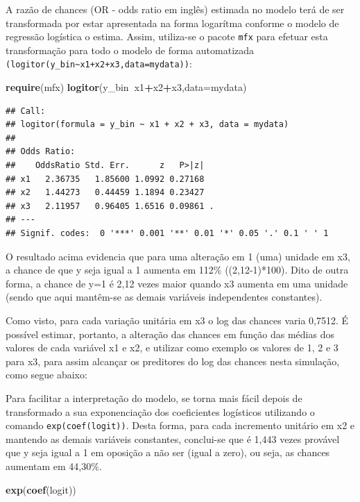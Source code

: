 \documentclass[12pt,brazil,]{book}
\newenvironment{Shaded}{\begin{snugshade}}{\end{snugshade}}
\newcommand{\DataTypeTok}[1]{\textcolor[rgb]{0.13,0.29,0.53}{#1}}
\newcommand{\KeywordTok}[1]{\textcolor[rgb]{0.13,0.29,0.53}{\textbf{#1}}}
\newcommand{\NormalTok}[1]{#1}
\newcommand{\OperatorTok}[1]{\textcolor[rgb]{0.81,0.36,0.00}{\textbf{#1}}}
\begin{document}
A razão de chances (OR - odds ratio em inglês) estimada no modelo terá
de ser transformada por estar apresentada na forma logarítma conforme o
modelo de regressão logística o estima. Assim, utiliza-se o pacote
\texttt{mfx} para efetuar esta transformação para todo o modelo de forma
automatizada
\texttt{(logitor(y\_bin\textasciitilde{}x1+x2+x3,data=mydata))}:

\begin{Shaded}
\begin{Highlighting}[]
\KeywordTok{require}\NormalTok{(mfx)}
\KeywordTok{logitor}\NormalTok{(y_bin}\OperatorTok{~}\NormalTok{x1}\OperatorTok{+}\NormalTok{x2}\OperatorTok{+}\NormalTok{x3,}\DataTypeTok{data=}\NormalTok{mydata)}
\end{Highlighting}
\end{Shaded}

\begin{verbatim}
## Call:
## logitor(formula = y_bin ~ x1 + x2 + x3, data = mydata)
## 
## Odds Ratio:
##    OddsRatio Std. Err.      z   P>|z|  
## x1   2.36735   1.85600 1.0992 0.27168  
## x2   1.44273   0.44459 1.1894 0.23427  
## x3   2.11957   0.96405 1.6516 0.09861 .
## ---
## Signif. codes:  0 '***' 0.001 '**' 0.01 '*' 0.05 '.' 0.1 ' ' 1
\end{verbatim}

O resultado acima evidencia que para uma alteração em 1 (uma) unidade em
x3, a chance de que y seja igual a 1 aumenta em 112\% ((2,12-1)*100).
Dito de outra forma, a chance de y=1 é 2,12 vezes maior quando x3
aumenta em uma unidade (sendo que aqui mantêm-se as demais variáveis
independentes constantes).

Como visto, para cada variação unitária em x3 o log das chances varia
0,7512. É possível estimar, portanto, a alteração das chances em função
das médias dos valores de cada variável x1 e x2, e utilizar como exemplo
os valores de 1, 2 e 3 para x3, para assim alcançar os preditores do log
das chances nesta simulação, como segue abaixo:

Para facilitar a interpretação do modelo, se torna mais fácil depois de
transformado a sua exponenciação dos coeficientes logísticos utilizando
o comando \texttt{exp(coef(logit))}. Desta forma, para cada incremento
unitário em x2 e mantendo as demais variáveis constantes, conclui-se que
é 1,443 vezes provável que y seja igual a 1 em oposição a não ser (igual
a zero), ou seja, as chances aumentam em 44,30\%.

\begin{Shaded}
\begin{Highlighting}[]
\KeywordTok{exp}\NormalTok{(}\KeywordTok{coef}\NormalTok{(logit))}
\end{Highlighting}
\end{Shaded}
\end{document}
